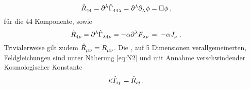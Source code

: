 \begin{equation}
\tensor{\hat{R}}{_4_4}
=\tensor{\partial}{^\lambda}\tensor*{\hat{\Gamma}}{_4_4_\lambda}
=\tensor{\partial}{^\lambda}\tensor{\partial}{_\lambda}\phi=\square\phi\,, 
\end{equation}
für die 44 Komponente, sowie 
\begin{equation}
\tensor{\hat{R}}{_4_\nu}
=\tensor{\partial}{^\lambda}\tensor*{\hat{\Gamma}}{_\lambda_4_\nu}
=-\alpha\tensor{\partial}{^\lambda}\tensor{F}{_\lambda_\nu}
=:-\alpha\tensor{J}{_\nu}\,.
\end{equation}
Trivialerweise gilt zudem $\tensor{\hat{R}}{_\mu_\nu}=\tensor{R}{_\mu_\nu}$. Die
, auf 5 Dimensionen verallgemeinerten, Feldgleichungen sind unter Näherung
\eqref{eq:N2} und mit Annahme verschwindender Kosmologischer Konstante
\begin{equation}
\kappa\tensor{\hat{T}}{_i_j}=\tensor{\hat{R}}{_i_j}\,.
\end{equation}
